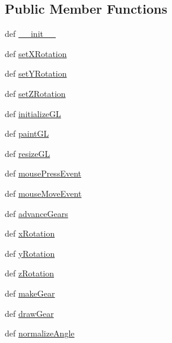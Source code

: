 \subsection*{Public Member Functions}
\begin{DoxyCompactItemize}
\item 
def \hyperlink{classgrabber_1_1GLWidget_ae1ca4eadb9a688367563ef12e9a448ea}{\+\_\+\+\_\+init\+\_\+\+\_\+}
\item 
def \hyperlink{classgrabber_1_1GLWidget_a2ef0cfe8ebfda7a5e194b36ae64aca54}{set\+X\+Rotation}
\item 
def \hyperlink{classgrabber_1_1GLWidget_ad3cc8cc20ca5d560500177415e2a1db3}{set\+Y\+Rotation}
\item 
def \hyperlink{classgrabber_1_1GLWidget_a6338cd7302bfa5d4f1fbe41469376cff}{set\+Z\+Rotation}
\item 
def \hyperlink{classgrabber_1_1GLWidget_a823a9f2bc8e4b4766b1e7c63ad6dd44f}{initialize\+G\+L}
\item 
def \hyperlink{classgrabber_1_1GLWidget_a9ec8e21040c6650cf1dfec3f7301ab3c}{paint\+G\+L}
\item 
def \hyperlink{classgrabber_1_1GLWidget_a2b28e17daf4730a1a3e2043f8d57e870}{resize\+G\+L}
\item 
def \hyperlink{classgrabber_1_1GLWidget_a128941f4ae60ad1dece450e24d07baff}{mouse\+Press\+Event}
\item 
def \hyperlink{classgrabber_1_1GLWidget_a995614eeb4ccb1c3701a004339eecc20}{mouse\+Move\+Event}
\item 
def \hyperlink{classgrabber_1_1GLWidget_a1e9036c67606ba10926266b2041b3bbf}{advance\+Gears}
\item 
def \hyperlink{classgrabber_1_1GLWidget_ab054e26299d1d1c0ef411157e84f324a}{x\+Rotation}
\item 
def \hyperlink{classgrabber_1_1GLWidget_acbe76ae96702d4ee4abc1303cfd407e3}{y\+Rotation}
\item 
def \hyperlink{classgrabber_1_1GLWidget_afb89b272ca1efc7afb9b1629630d9eeb}{z\+Rotation}
\item 
def \hyperlink{classgrabber_1_1GLWidget_a07e5eeab2db69023dd08180e64a8c4f2}{make\+Gear}
\item 
def \hyperlink{classgrabber_1_1GLWidget_a77eba40a4c8559849192007be0da1a65}{draw\+Gear}
\item 
def \hyperlink{classgrabber_1_1GLWidget_ab0fdb64088f5160d3f635a1a9679ff18}{normalize\+Angle}
\end{DoxyCompactItemize}
